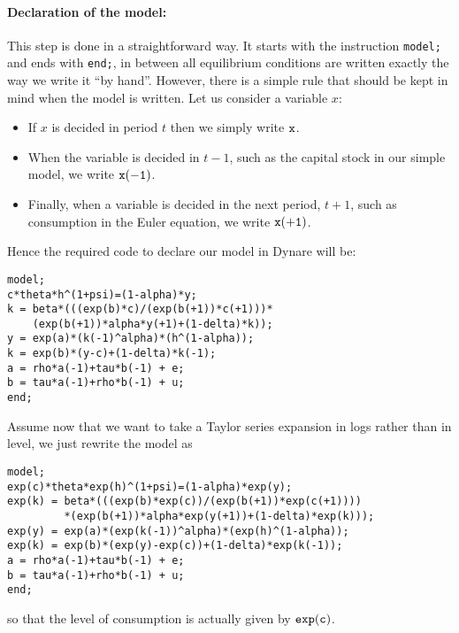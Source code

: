 \documentclass[11pt,a4paper]{article}
\begin{document}
\paragraph{Declaration of the model:}
This step is done in a straightforward way. It starts with the instruction {\tt model;} and ends with {\tt end;}, in between all equilibrium conditions are written exactly the way we write it ``by hand''. However, there is a simple rule that should be kept in mind when the model is written. Let us consider a variable $x$: 
\begin{itemize}
\item If $x$ is decided in period $t$ then we simply write ${\tt x}$. 
\item When the variable is decided in $t-1$, such as the capital stock in our simple model, we write ${\tt x(-1)}$. \item Finally, when a variable is decided in the next period, $t+1$, such as consumption in the Euler equation, we write ${\tt x(+1)}$.
\end{itemize}
Hence the required code to declare our model in {\sc Dynare} will be:
\begin{verbatim}
model;
c*theta*h^(1+psi)=(1-alpha)*y;
k = beta*(((exp(b)*c)/(exp(b(+1))*c(+1)))*
    (exp(b(+1))*alpha*y(+1)+(1-delta)*k));
y = exp(a)*(k(-1)^alpha)*(h^(1-alpha));
k = exp(b)*(y-c)+(1-delta)*k(-1);
a = rho*a(-1)+tau*b(-1) + e;
b = tau*a(-1)+rho*b(-1) + u;
end;
\end{verbatim}
Assume now that we want to take a Taylor series expansion in logs rather than in level, we just rewrite the model as
\begin{verbatim}
model;
exp(c)*theta*exp(h)^(1+psi)=(1-alpha)*exp(y);
exp(k) = beta*(((exp(b)*exp(c))/(exp(b(+1))*exp(c(+1))))
         *(exp(b(+1))*alpha*exp(y(+1))+(1-delta)*exp(k)));
exp(y) = exp(a)*(exp(k(-1))^alpha)*(exp(h)^(1-alpha));
exp(k) = exp(b)*(exp(y)-exp(c))+(1-delta)*exp(k(-1));
a = rho*a(-1)+tau*b(-1) + e;
b = tau*a(-1)+rho*b(-1) + u;
end;
\end{verbatim}
so that the level of consumption is actually given by ${\tt exp(c)}$.
\end{document}
